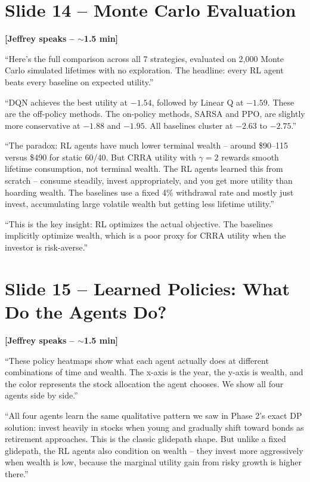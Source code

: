 \documentclass[11pt, letterpaper]{article}
\begin{document}
\section{Slide 14 -- Monte Carlo Evaluation}

\textbf{[Jeffrey speaks -- $\sim$1.5 min]}

``Here's the full comparison across all 7 strategies, evaluated on 2,000 Monte Carlo simulated lifetimes with no exploration. The headline: every RL agent beats every baseline on expected utility.''

``DQN achieves the best utility at $-1.54$, followed by Linear Q at $-1.59$. These are the off-policy methods. The on-policy methods, SARSA and PPO, are slightly more conservative at $-1.88$ and $-1.95$. All baselines cluster at $-2.63$ to $-2.75$.''

``The paradox: RL agents have much lower terminal wealth -- around \$90--115 versus \$490 for static 60/40. But CRRA utility with $\gamma = 2$ rewards smooth lifetime consumption, not terminal wealth. The RL agents learned this from scratch -- consume steadily, invest appropriately, and you get more utility than hoarding wealth. The baselines use a fixed 4\% withdrawal rate and mostly just invest, accumulating large volatile wealth but getting less lifetime utility.''

``This is the key insight: RL optimizes the actual objective. The baselines implicitly optimize wealth, which is a poor proxy for CRRA utility when the investor is risk-averse.''

\section{Slide 15 -- Learned Policies: What Do the Agents Do?}

\textbf{[Jeffrey speaks -- $\sim$1.5 min]}

``These policy heatmaps show what each agent actually does at different combinations of time and wealth. The x-axis is the year, the y-axis is wealth, and the color represents the stock allocation the agent chooses. We show all four agents side by side.''

``All four agents learn the same qualitative pattern we saw in Phase 2's exact DP solution: invest heavily in stocks when young and gradually shift toward bonds as retirement approaches. This is the classic glidepath shape. But unlike a fixed glidepath, the RL agents also condition on wealth -- they invest more aggressively when wealth is low, because the marginal utility gain from risky growth is higher there.''
\end{document}
